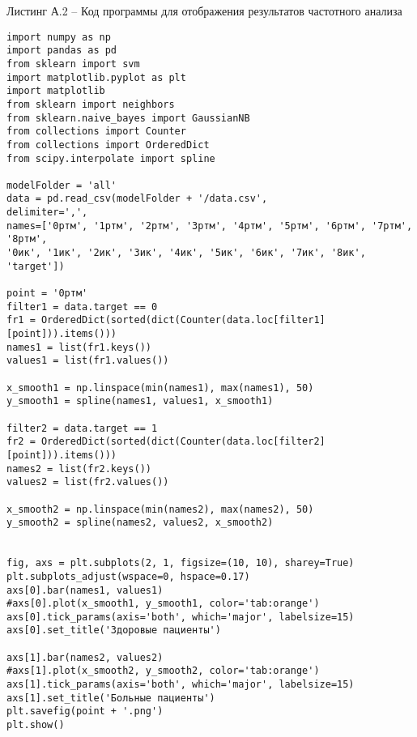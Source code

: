 \Large
\par
Листинг А.2 -- Код программы для отображения результатов частотного анализа
\vspace{8mm}
\large
\begin{verbatim}
import numpy as np
import pandas as pd
from sklearn import svm
import matplotlib.pyplot as plt
import matplotlib
from sklearn import neighbors
from sklearn.naive_bayes import GaussianNB
from collections import Counter
from collections import OrderedDict
from scipy.interpolate import spline

modelFolder = 'all'
data = pd.read_csv(modelFolder + '/data.csv', 
delimiter=',', 
names=['0ртм', '1ртм', '2ртм', '3ртм', '4ртм', '5ртм', '6ртм', '7ртм', '8ртм', 
'0ик', '1ик', '2ик', '3ик', '4ик', '5ик', '6ик', '7ик', '8ик', 'target'])

point = '0ртм'
filter1 = data.target == 0
fr1 = OrderedDict(sorted(dict(Counter(data.loc[filter1][point])).items()))
names1 = list(fr1.keys())
values1 = list(fr1.values())

x_smooth1 = np.linspace(min(names1), max(names1), 50)
y_smooth1 = spline(names1, values1, x_smooth1)

filter2 = data.target == 1
fr2 = OrderedDict(sorted(dict(Counter(data.loc[filter2][point])).items()))
names2 = list(fr2.keys())
values2 = list(fr2.values())

x_smooth2 = np.linspace(min(names2), max(names2), 50)
y_smooth2 = spline(names2, values2, x_smooth2)


fig, axs = plt.subplots(2, 1, figsize=(10, 10), sharey=True)
plt.subplots_adjust(wspace=0, hspace=0.17)
axs[0].bar(names1, values1)
#axs[0].plot(x_smooth1, y_smooth1, color='tab:orange')
axs[0].tick_params(axis='both', which='major', labelsize=15)
axs[0].set_title('Здоровые пациенты')

axs[1].bar(names2, values2)
#axs[1].plot(x_smooth2, y_smooth2, color='tab:orange')
axs[1].tick_params(axis='both', which='major', labelsize=15)
axs[1].set_title('Больные пациенты')
plt.savefig(point + '.png')
plt.show()
\end{verbatim}
\vspace{8mm}
\Large